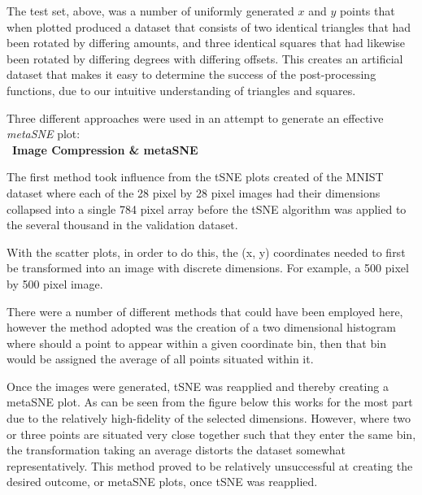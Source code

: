 \documentclass[a4paper,11pt,titlepage]{article}
\begin{document}
	The test set, above, was a number of uniformly generated $x$ and $y$ points that when plotted produced a dataset that consists of two identical triangles that had been rotated by differing amounts, and three identical squares that had likewise been rotated by differing degrees with differing offsets. This creates an artificial dataset that makes it easy to determine the success of the post-processing functions, due to our intuitive understanding of triangles and squares.
	\par 
	Three different approaches were used in an attempt to generate an effective \textit{metaSNE} plot:
	\\\
	\textbf{Image Compression \& metaSNE}
	\par
	The first method took influence from the tSNE plots created of the MNIST dataset where each of the 28 pixel by 28 pixel images had their dimensions collapsed into a single 784 pixel array before the tSNE algorithm was applied to the several thousand in the validation dataset.
	\par 
	With the scatter plots, in order to do this, the (x, y) coordinates needed to first be transformed into an image with discrete dimensions. For example, a 500 pixel by 500 pixel image. 
	\par 
	There were a number of different methods that could have been employed here, however the method adopted was the creation of a two dimensional histogram where should a point to appear within a given coordinate bin, then that bin would be assigned the average of all points situated within it.
	\par 
	Once the images were generated, tSNE was reapplied and thereby creating a metaSNE plot.	As can be seen from the figure below this works for the most part due to the relatively high-fidelity of the selected dimensions. However, where two or three points are situated very close together such that they enter the same bin, the transformation taking an average distorts the dataset somewhat representatively. This method proved to be relatively unsuccessful at creating the desired outcome, or metaSNE plots, once tSNE was reapplied.
	
\end{document}
